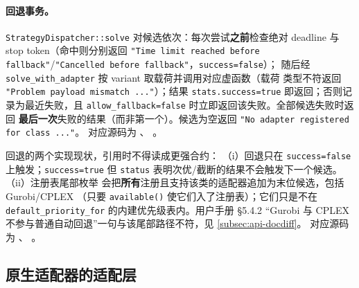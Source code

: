 \paragraph{回退事务。}
\texttt{StrategyDispatcher::solve} 对候选依次：每次尝试\textbf{之前}检查绝对
deadline 与 stop token（命中则分别返回 \texttt{"Time limit reached before
fallback"}/\texttt{"Cancelled before fallback"}，\texttt{success=false}）；
随后经 \texttt{solve\_with\_adapter} 按 variant 取载荷并调用对应虚函数（载荷
类型不符返回 \texttt{"Problem payload mismatch ..."}）；结果
\texttt{stats.success=true} 即返回；否则记录为最近失败，且
\texttt{allow\_fallback=false} 时立即返回该失败。全部候选失败时返回
\textbf{最后一次}失败的结果（而非第一个）。候选为空返回
\texttt{"No adapter registered for class ..."}。
对应源码为
、
。

\begin{boundarynote}
回退的两个实现现状，引用时不得读成更强合约：
（i）回退只在 \texttt{success=false} 上触发；\texttt{success=true} 但
\texttt{status} 表明次优/截断的结果不会触发下一个候选。（ii）注册表尾部枚举
会把\textbf{所有}注册且支持该类的适配器追加为末位候选，包括 Gurobi/CPLEX
（只要 \texttt{available()} 使它们入了注册表）；它们只是不在
\texttt{default\_priority\_for} 的内建优先级表内。用户手册 \S 5.4.2
``Gurobi 与 CPLEX 不参与普通自动回退''一句与该尾部路径不符，见
\ref{subsec:api-docdiff}。
对应源码为
、
。
\end{boundarynote}

\subsection{原生适配器的适配层}\label{subsec:api-native}

